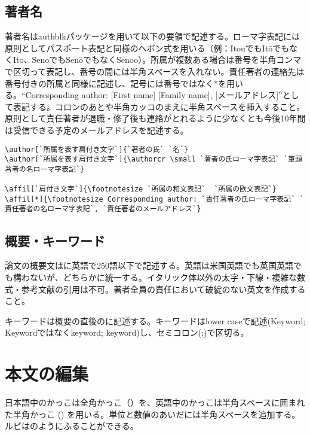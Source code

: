 \documentclass[fontsize=9pt, jafontscale=.95, twocolumn, a4paper]{jlreq}
\newcommand{\abstractcontent}{Write in English. Lorem ipsum dolor sit amet, consectetur adipiscing elit. Suspendisse ac enim turpis. Morbi eu maximus velit, ac maximus enim. Phasellus et pellentesque ante. Pellentesque non velit id tortor rutrum pretium a ac neque. Sed congue sit amet leo vel laoreet. Vivamus ullamcorper a dolor in aliquet. Pellentesque finibus at nunc ac egestas. Proin eu sollicitudin nisi. Sed cursus pulvinar leo. In erat erat, molestie ac euismod at, egestas non neque. Nam viverra nunc erat, vitae elementum tortor cursus et. Duis sed magna vel turpis congue finibus.Morbi pulvinar auctor quam eget commodo. Quisque mi nulla, tempor quis sem sed, auctor pharetra turpis. Cras blandit vestibulum dapibus. Sed ac nisi et metus sollicitudin tincidunt rutrum eget felis. Donec imperdiet dolor nec elit interdum, vitae ultrices turpis consectetur. Sed lacinia tempus lacinia. Morbi facilisis metus ac diam sollicitudin, et ornare urna rutrum. Nullam sollicitudin fringilla ipsum, nec vulputate risus. Sed sit amet euismod nulla.Proin porttitor diam ac lacus vehicula facilisis. Sed at tempus magna. Aenean eget vehicula ipsum, non porta arcu. Suspendisse vitae lacinia leo. Ut sit amet purus imperdiet ipsum tempor efficitur auctor eget magna. Phasellus suscipit risus eu semper eleifend. Ut tempor magna viverra urna condimentum, sed pretium ipsum iaculis. Pellentesque aliquet tincidunt felis ac imperdiet.Phasellus viverra tristique lorem, in dignissim risus bibendum non. Praesent varius urna eget nibh lacinia, sed faucibus turpis tristique. Proin hendrerit pretium ullamcorper . Donec non vestibulum diam. Sed suscipit, justo sit amet auctor aliquam, orci sem sollicitudin lacus, et maximus. (max 250 words)}
\newcommand{\keywordscontent}{keyword1; keyword2; keyword3 (max 5 keywords)}
\begin{document}
\subsection*{著者名}

著者名はauthblkパッケージを用いて以下の要領で記述する。ローマ字表記には原則としてパスポート表記と同様のヘボン式を用いる（例：ItouでもItōでもなくIto、SenoでもSenōでもなくSenoo）。所属が複数ある場合は番号を半角コンマで区切って表記し、番号の間には半角スペースを入れない。責任著者の連絡先は番号付きの所属と同様に記述し、記号には番号ではなく*を用いる。“Corresponding author: [First name] [Family name], [メールアドレス]”として表記する。コロンのあとや半角カッコのまえに半角スペースを挿入すること。原則として責任著者が退職・修了後も連絡がとれるように少なくとも今後10年間は受信できる予定のメールアドレスを記述する。

\begin{verbatim}
\author[`所属を表す肩付き文字`]{`著者の氏` `名`}
\author[`所属を表す肩付き文字`]{\authorcr \small `著者の氏ローマ字表記` `筆頭著者の名ローマ字表記`}

\affil[`肩付き文字`]{\footnotesize `所属の和文表記`  `所属の欧文表記`}
\affil[*]{\footnotesize Corresponding author: `責任著者の氏ローマ字表記` `責任著者の名ローマ字表記`, `責任著者のメールアドレス`}
\end{verbatim}

\subsection*{概要・キーワード}

論文の概要文は\texttt{\newcommand{\abstractcontent}{abstract here}}に英語で250語以下で記述する。英語は米国英語でも英国英語でも構わないが、どちらかに統一する。イタリック体以外の太字・下線・複雑な数式・参考文献の引用は不可。著者全員の責任において破綻のない英文を作成すること。

キーワードは概要の直後の\texttt{\newcommand{\keywordscontent}{keywords here}}に記述する。キーワードはlower caseで記述(Keyword; Keywordではなくkeyword; keyword)し、セミコロン(;)で区切る。


\section{本文の編集}

日本語中のかっこは全角かっこ（）を、英語中のかっこは半角スペースに囲まれた半角かっこ () を用いる。単位と数値のあいだには半角スペースを追加する。ルビはのようにふることができる。
\end{document}
